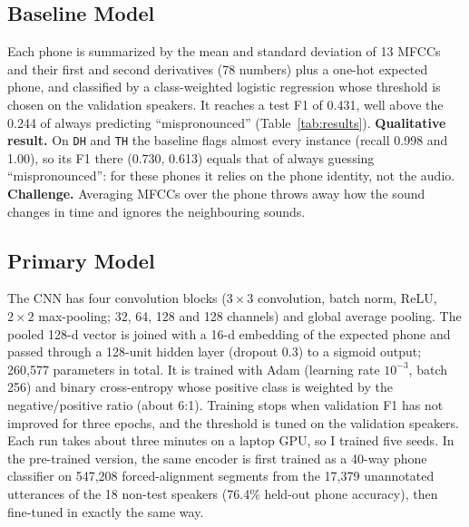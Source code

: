 \documentclass[final]{article}
\begin{document}
\subsection*{Baseline Model}
Each phone is summarized by the mean and standard deviation of 13 MFCCs and their first and second derivatives (78
numbers) plus a one-hot expected phone, and classified by a class-weighted logistic regression whose threshold is
chosen on the validation speakers. It reaches a test F1 of 0.431, well above the 0.244 of always predicting
``mispronounced'' (Table~\ref{tab:results}). \textbf{Qualitative result.} On \texttt{DH} and \texttt{TH} the
baseline flags almost every instance (recall 0.998 and 1.00), so its F1 there (0.730, 0.613) equals that of always
guessing ``mispronounced'': for these phones it relies on the phone identity, not the audio. \textbf{Challenge.}
Averaging MFCCs over the phone throws away how the sound changes in time and ignores the neighbouring sounds.

\subsection*{Primary Model}
The CNN has four convolution blocks ($3\times3$ convolution, batch norm, ReLU, $2\times2$ max-pooling; 32, 64, 128
and 128 channels) and global average pooling. The pooled 128-d vector is joined with a 16-d embedding of the expected
phone and passed through a 128-unit hidden layer (dropout 0.3) to a sigmoid output; 260,577 parameters in total. It
is trained with Adam (learning rate $10^{-3}$, batch 256) and binary cross-entropy whose positive class is weighted by
the negative/positive ratio (about 6:1). Training stops when validation F1 has not improved for three epochs, and the
threshold is tuned on the validation speakers. Each run takes about three minutes on a laptop GPU, so I trained five
seeds. In the pre-trained version, the same encoder is first trained as a 40-way phone classifier on 547,208
forced-alignment segments from the 17,379 unannotated utterances of the 18 non-test speakers (76.4\% held-out phone
accuracy), then fine-tuned in exactly the same way.
\end{document}
